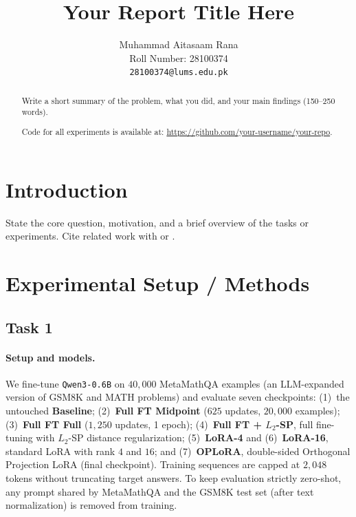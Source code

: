 \documentclass{article}
\title{Your Report Title Here}
\author{
    Muhammad Aitasaam Rana \\
    Roll Number: 28100374 \\
    \texttt{28100374@lums.edu.pk} \\
}
\begin{document}
\maketitle

\begin{abstract}
Write a short summary of the problem, what you did, and your main findings (150--250 words).

Code for all experiments is available at:
\url{https://github.com/your-username/your-repo}.
\end{abstract}

\section{Introduction}
State the core question, motivation, and a brief overview of the tasks or experiments. Cite related work with \citep{key} or \citet{key}.

\section{Experimental Setup / Methods}
\subsection{Task 1}
\label{sec:task1-protocol}

\paragraph{Setup and models.}
We fine-tune \texttt{Qwen3-0.6B} on $40{,}000$ MetaMathQA examples (an LLM-expanded version of GSM8K and MATH problems) and evaluate seven checkpoints: (1)~the untouched \textbf{Baseline}; (2)~\textbf{Full FT Midpoint} ($625$ updates, $20{,}000$ examples); (3)~\textbf{Full FT Full} ($1{,}250$ updates, 1 epoch); (4)~\textbf{Full FT + $L_2$-SP}, full fine-tuning with $L_2$-SP distance regularization; (5)~\textbf{LoRA-4} and (6)~\textbf{LoRA-16}, standard LoRA with rank $4$ and $16$; and (7)~\textbf{OPLoRA}, double-sided Orthogonal Projection LoRA (final checkpoint). Training sequences are capped at $2{,}048$ tokens without truncating target answers. To keep evaluation strictly zero-shot, any prompt shared by MetaMathQA and the GSM8K test set (after text normalization) is removed from training.
\end{document}
